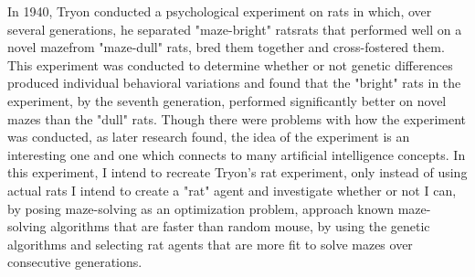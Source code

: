 \documentclass[12pt]{article}
\begin{document}
\hspace*{\parindent} In 1940, Tryon conducted a psychological experiment on rats in which, over several generations, he separated "maze-bright" rats\textemdash rats that performed well on a novel maze\textemdash from "maze-dull" rats, bred them together and cross-fostered them. This experiment was conducted to determine whether or not genetic differences produced individual behavioral variations and found that the "bright" rats in the experiment, by the seventh generation, performed significantly better on novel mazes than the "dull" rats. Though there were problems with how the experiment was conducted, as later research found, the idea of the experiment is an interesting one and one which connects to many artificial intelligence concepts. In this experiment, I intend to recreate Tryon's rat experiment, only instead of using actual rats I intend to create a "rat" agent and investigate whether or not I can, by posing maze-solving as an optimization problem, approach known maze-solving algorithms that are faster than random mouse, by using the genetic algorithms and selecting rat agents that are more fit to solve mazes over consecutive generations.
\end{document}
